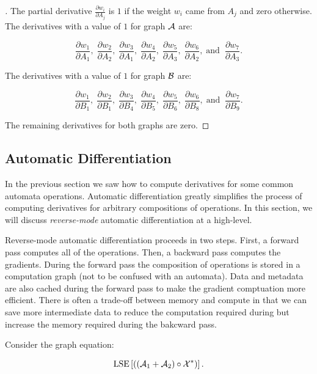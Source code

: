 \begin{proof}[\unskip\nopunct]
The partial derivative $\frac{\partial w_i}{\partial A_j}$ is $1$ if the weight
$w_i$ came from $A_j$ and zero otherwise. The derivatives with a value of $1$
for graph $\mathcal{A}$ are:

$$
\frac{\partial w_1}{\partial A_1}, \; \frac{\partial w_2}{\partial A_2}, \;
    \frac{\partial w_3}{\partial A_1}, \; \frac{\partial w_4}{\partial A_2}, \;
    \frac{\partial w_5}{\partial A_3}, \; \frac{\partial w_6}{\partial A_2}, \;
    \textrm{and} \;\; \frac{\partial w_7}{\partial A_3}.
$$

The derivatives with a value of $1$ for graph $\mathcal{B}$ are:

$$
\frac{\partial w_1}{\partial B_1}, \; \frac{\partial w_2}{\partial B_1}, \;
    \frac{\partial w_3}{\partial B_4}, \; \frac{\partial w_4}{\partial B_5}, \;
    \frac{\partial w_5}{\partial B_6}, \; \frac{\partial w_6}{\partial B_8}, \;
    \textrm{and} \;\; \frac{\partial w_7}{\partial B_9}.
$$

The remaining derivatives for both graphs are zero.
\end{proof}

\subsection{Automatic Differentiation}

In the previous section we saw how to compute derivatives for some common
automata operations. Automatic differentiation greatly simplifies the process
of computing derivatives for arbitrary compositions of operations. In this
section, we will discuss \emph{reverse-mode} automatic differentiation at a
high-level.

Reverse-mode automatic differentiation proceeds in two steps. First, a forward
pass computes all of the operations. Then, a backward pass computes the
gradients. During the forward pass the composition of operations is stored in a
computation graph (not to be confused with an automata). Data and metadata are
also cached during the forward pass to make the gradient comptuation more
efficient. There is often a trade-off between memory and compute in that we can
save more intermediate data to reduce the computation required during but
increase the memory required during the bakcward pass.

Consider the graph equation:

\begin{equation}
    \label{eq:compute_graph}
    \operatorname*{\textrm{LSE}}\left[ \left(\left(\mathcal{A}_1 + \mathcal{A}_2\right) \circ \mathcal{X}^*\right) \right].
\end{equation}


